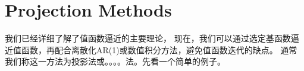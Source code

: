 
\section{Projection Methods}    \label{sec-projection}

我们已经详细了解了值函数逼近的主要理论，
现在，我们可以通过选定基函数逼近值函数，再配合离散化AR(1)或数值积分方法，避免值函数迭代的缺点。
通常我们称这一方法为投影法或。。。。法。先看一个简单的例子。